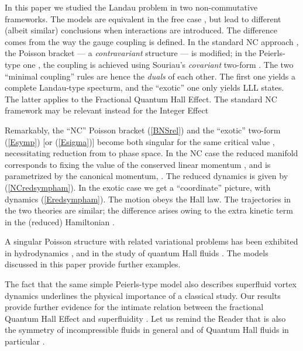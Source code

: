 \documentclass[a4paper,11pt]{article}
\providecommand{\red}{{\rm red}}
\def\vp{{\vec p}}
\begin{document}
In this paper we studied the Landau problem in
two  non-commutative frameworks. The models
are equivalent in the free case \cite{DH},
but lead to different (albeit similar)  conclusions when interactions
are introduced.
The difference comes from the way the gauge coupling is defined.
In the standard NC approach \cite{BNS, NaPo, GAMB},
the Poisson bracket ---  a {\it contravariant} structure --- is modified;
in the Peierls-type one \cite{DJT, DuJa, DH}, the coupling is achieved
using Souriau's {\it covariant} two-form \myHighlight{$\sigma$}\coordHE{}.
The two ``minimal coupling'' rules are hence the {\it duals} of each other.
The first one yields a complete Landau-type specturm, and the  ``exotic''
one only yields LLL states.
The latter applies to
the Fractional Quantum Hall Effect. The standard NC framework may be
relevant instead for the Integer Effect \cite{QHE, MorPo}
\goodbreak

  Remarkably, the ``NC'' Poisson bracket
(\ref{BNSrel}) and the ``exotic'' two-form (\ref{Esymp})
[or (\ref{Esigma})]
become both singular for the same critical value \coordHE{},
necessitating reduction from \coordHE{} to \coordHE{} phase space.
In the NC case the reduced manifold corresponds to fixing the value of
the conserved linear momentum \myHighlight{$\varpi$}\coordHE{}, and is parametrized by the
canonical momentum, \myHighlight{$\vp$}\coordHE{}. The reduced dynamics is given by
(\ref{NCredsympham}). In the exotic case
we get a ``coordinate'' picture, with dynamics (\ref{Eredsympham}).
The motion obeys the Hall law.
The trajectories in the two theories
are similar; the difference arises owing to the
extra kinetic term in the (reduced) Hamiltonian \myHighlight{$H_{NC}^{\red}$}\coordHE{}.

A singular Poisson structure with related variational
problems has been exhibited in hydrodynamics
\cite{JACKREV}, and in the study of
quantum Hall fluids \cite{QHF}. The models discussed in this paper
provide further examples.

The fact that the same simple Peierls-type model also describes superfluid
vortex dynamics  underlines the physical importance of a classical
study. Our results provide further evidence for the
  intimate relation between the fractional Quantum Hall Effect
and superfluidity \cite{LeMy}.
Let us remind the Reader that \coordHE{} is also the symmetry of
  incompressible fluids \cite{Arnold} in general
  and of Quantum Hall fluids in particular \cite{Winfty, QHF}.
\end{document}
